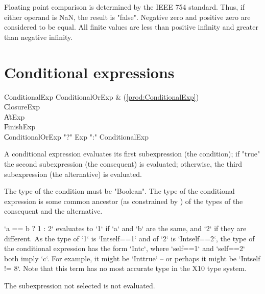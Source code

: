 Floating point comparison is determined by the IEEE 754
standard.  Thus,
if either operand is NaN, the result is \xcd"false".
Negative zero and positive zero are considered to be equal.
All finite values are less than positive infinity and greater
than negative infinity.



\section{Conditional expressions}
\label{Conditional}

\begin{bbgrammar}
      ConditionalExp \: ConditionalOrExp & (\ref{prod:ConditionalExp}) \\
                    \| ClosureExp \\
                    \| AtExp \\
                    \| FinishExp \\
                    \| ConditionalOrExp \xcd"?" Exp \xcd":" ConditionalExp \\
\end{bbgrammar}

A conditional expression evaluates its first subexpression (the
condition); if \xcd"true"
the second subexpression (the consequent) is evaluated; otherwise,
the third subexpression (the alternative) is evaluated.

The type of the condition must be \xcd"Boolean".
The type of the conditional expression is some common 
ancestor (as constrained by ) of the types of the consequent and the
alternative. 

\begin{ex}
\xcd`a == b ? 1 : 2`
evaluates to \xcd`1` if \xcd`a` and \xcd`b` are the same, and \xcd`2` if they
are different.   As the type of \xcd`1` is \xcd`Int{self==1}` and of \xcd`2`
is \xcd`Int{self==2}`, the type of the conditional expression has the form
\xcd`Int{c}`, where \xcd`self==1` and \xcd`self==2` both imply \xcd`c`.  For
example, it might be \xcd`Int{true}` -- or perhaps it might be 
\xcd`Int{self != 8}`. Note that this term has no most accurate type in the X10
type system.
\end{ex}

The subexpression not selected is not evaluated.

